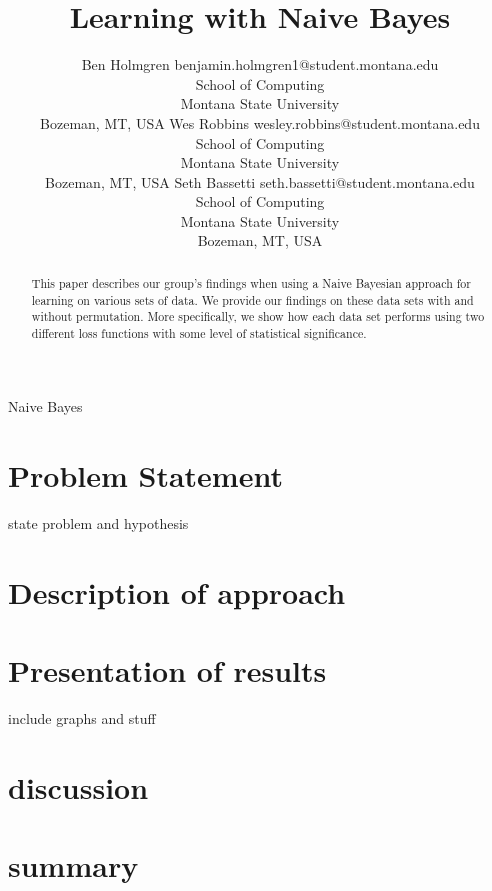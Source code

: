 \documentclass[twoside,11pt]{article}
\begin{document}
\title{Learning with Naive Bayes}

\author{\name Ben Holmgren \email benjamin.holmgren1@student.montana.edu \\
       \addr School of Computing\\
       Montana State University\\
       Bozeman, MT, USA
       \AND
       \name Wes Robbins \email wesley.robbins@student.montana.edu \\
       \addr School of Computing\\
       Montana State University\\
       Bozeman, MT, USA
       \AND
       \name Seth Bassetti \email seth.bassetti@student.montana.edu \\
       \addr School of Computing\\
       Montana State University\\
       Bozeman, MT, USA}

\maketitle

\begin{abstract}%
This paper describes our group's findings when using a Naive Bayesian
approach for learning on various sets of data. We provide our findings on
these data sets with and without permutation. More specifically, we show
how each data set performs using two different loss functions with some
level of statistical significance. 
\end{abstract}


\begin{keywords}
  Naive Bayes
\end{keywords}

\section{Problem Statement}
state problem and hypothesis

\section{Description of approach}

\section{Presentation of results}
include graphs and stuff

\section{discussion}

\section{summary}

\vskip 0.2in

\end{document}

